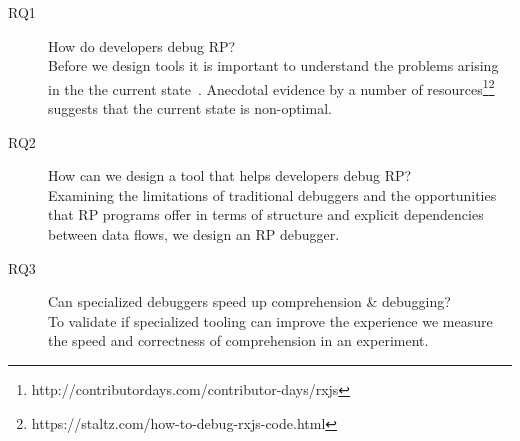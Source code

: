 \begin{description}
\item[RQ1] How do developers debug RP? \\
Before we design tools it is important to understand the problems arising in the the current state~\cite{singer2010examination}. Anecdotal evidence by a number of resources\footnote{http://contributordays.com/contributor-days/rxjs}\footnote{https://staltz.com/how-to-debug-rxjs-code.html}
suggests that the current state is non-optimal.

%

\item[RQ2] How can we design a tool that helps developers debug RP? \\
Examining the limitations of traditional debuggers and the opportunities that RP programs offer in terms of structure and explicit dependencies between data flows, we design an RP debugger.


\item[RQ3] Can specialized debuggers speed up comprehension \& debugging? \\
To validate if specialized tooling can improve the experience we measure the speed and correctness of comprehension in an experiment.

\end{description}


